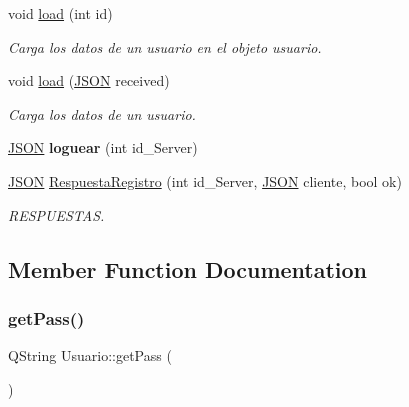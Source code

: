 \begin{DoxyCompactItemize}
void \mbox{\hyperlink{classUsuario_a582cfc5fb035575f66240d1784c50632}{load}} (int id)
\begin{DoxyCompactList}\small\item\em Carga los datos de un usuario en el objeto usuario. \end{DoxyCompactList}\item 
void \mbox{\hyperlink{classUsuario_ae1167727130e5f8fb07fad0d7c179c41}{load}} (\mbox{\hyperlink{jugador_8h_ab6104b89642419db4e355b7b2e40abbe}{J\+S\+ON}} received)
\begin{DoxyCompactList}\small\item\em Carga los datos de un usuario. \end{DoxyCompactList}\item 
\mbox{\label{classUsuario_a1c5dda54d22375d8daa0d121df105b7d}} 
\mbox{\hyperlink{jugador_8h_ab6104b89642419db4e355b7b2e40abbe}{J\+S\+ON}} {\bfseries loguear} (int id\+\_\+\+Server)
\item 
\mbox{\label{classUsuario_a480797ff338cebce9bc00784e8007dfc}} 
\mbox{\hyperlink{jugador_8h_ab6104b89642419db4e355b7b2e40abbe}{J\+S\+ON}} \mbox{\hyperlink{classUsuario_a480797ff338cebce9bc00784e8007dfc}{Respuesta\+Registro}} (int id\+\_\+\+Server, \mbox{\hyperlink{jugador_8h_ab6104b89642419db4e355b7b2e40abbe}{J\+S\+ON}} cliente, bool ok)
\begin{DoxyCompactList}\small\item\em R\+E\+S\+P\+U\+E\+S\+T\+AS. \end{DoxyCompactList}\end{DoxyCompactItemize}


\subsection{Member Function Documentation}
\mbox{\label{classUsuario_ae00ae9ee09459165c7b7ecb060ff7071}} 
\subsubsection{\texorpdfstring{get\+Pass()}{getPass()}}
{\footnotesize\ttfamily Q\+String Usuario\+::get\+Pass (\begin{DoxyParamCaption}{ }\end{DoxyParamCaption})}



